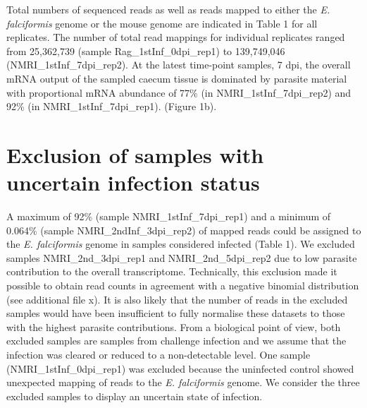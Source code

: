 \documentclass{bmcart}
\begin{document}
Total numbers of sequenced reads as well as reads mapped to either the \textit{E. falciformis} genome or the mouse genome are indicated in Table 1 for all replicates. The number of total read mappings for individual replicates ranged from 25,362,739 (sample Rag\_1stInf\_0dpi\_rep1) to 139,749,046 (NMRI\_1stInf\_7dpi\_rep2). At the latest time-point samples, 7 dpi, the overall mRNA output of the sampled caecum tissue is dominated by parasite material with proportional mRNA abundance of 77\% (in NMRI\_1stInf\_7dpi\_rep2) and 92\% (in NMRI\_1stInf\_7dpi\_rep1). (Figure 1b). 

\section*{Exclusion of samples with uncertain infection status}
A maximum of 92\% (sample NMRI\_1stInf\_7dpi\_rep1) and a minimum of 0.064\% (sample NMRI\_2ndInf\_3dpi\_rep2) of mapped reads could be assigned to the \textit{E. falciformis} genome in samples considered infected (Table 1). We excluded samples NMRI\_2nd\_3dpi\_rep1 and NMRI\_2nd\_5dpi\_rep2 due to low parasite contribution to the overall transcriptome. Technically, this exclusion made it possible to obtain read counts in agreement with a negative binomial distribution (see additional file x). It is also likely that the number of reads in the excluded samples would have been insufficient to fully normalise these datasets to those with the highest parasite contributions. From a biological point of view, both excluded samples are samples from challenge infection and we assume that the infection was cleared or reduced to a non-detectable level. One sample (NMRI\_1stInf\_0dpi\_rep1) was excluded because the uninfected control showed unexpected mapping of reads to the \textit{E. falciformis} genome. We consider the three excluded samples to display an uncertain state of infection.
\end{document}
